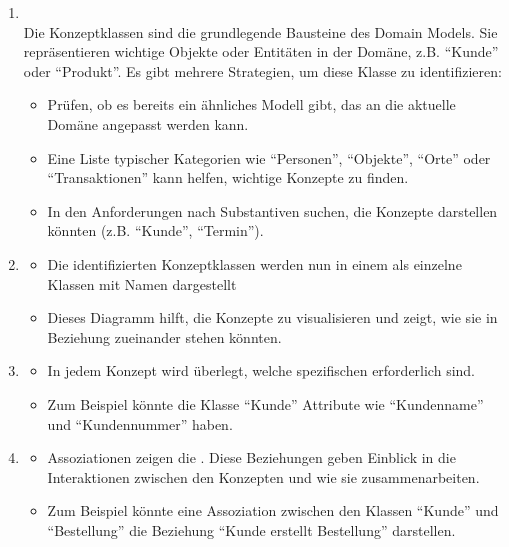 \begin{infoBox}[title=Workflow zur Erstellung eines Domain Models]
    \begin{enumerate}
        \item {}\\
        Die Konzeptklassen sind die grundlegende Bausteine des Domain Models. Sie repräsentieren wichtige Objekte oder Entitäten in der Domäne, z.B. \enquote{Kunde} oder \enquote{Produkt}. Es gibt mehrere Strategien, um diese Klasse zu identifizieren:
        \begin{itemize}
            \item {} Prüfen, ob es bereits ein ähnliches Modell gibt, das an die aktuelle Domäne angepasst werden kann.
            \item {} Eine Liste typischer Kategorien wie \enquote{Personen}, \enquote{Objekte}, \enquote{Orte} oder \enquote{Transaktionen} kann helfen, wichtige Konzepte zu finden.
            \item {} In den Anforderungen nach Substantiven suchen, die Konzepte darstellen könnten (z.B. \enquote{Kunde}, \enquote{Termin}).
        \end{itemize}
        \item {}
        \begin{itemize}
            \item Die identifizierten Konzeptklassen werden nun in einem  als einzelne Klassen mit Namen dargestellt
            \item Dieses Diagramm hilft, die Konzepte zu visualisieren und zeigt, wie sie in Beziehung zueinander stehen könnten.
        \end{itemize}
        \item {}
        \begin{itemize}
            \item In jedem Konzept wird überlegt, welche spezifischen  erforderlich sind.
            \item Zum Beispiel könnte die Klasse \enquote{Kunde} Attribute wie \enquote{Kundenname} und \enquote{Kundennummer} haben.
        \end{itemize}
        \item {}
        \begin{itemize}
            \item Assoziationen zeigen die . Diese Beziehungen geben Einblick in die Interaktionen zwischen den Konzepten und wie sie zusammenarbeiten.
            \item Zum Beispiel könnte eine Assoziation zwischen den Klassen \enquote{Kunde} und \enquote{Bestellung} die Beziehung \enquote{Kunde erstellt Bestellung} darstellen.
        \end{itemize}
    \end{enumerate}
\end{infoBox}

